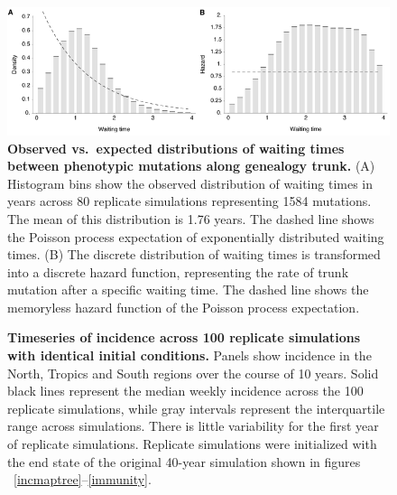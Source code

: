 \documentclass[11pt,oneside,letterpaper]{article}
\begin{document}
\begin{figure}[c]
	\centering
	\includegraphics{figures/waittimes}
	\caption{\textbf{Observed vs.\ expected distributions of waiting times between phenotypic mutations along genealogy trunk.} (A) Histogram bins show the observed distribution of waiting times in years across 80 replicate simulations representing 1584 mutations.  The mean of this distribution is 1.76 years.  The dashed line shows the Poisson process expectation of exponentially distributed waiting times.  (B) The discrete distribution of waiting times is transformed into a discrete hazard function, representing the rate of trunk mutation after a specific waiting time.  The dashed line shows the memoryless hazard function of the Poisson process expectation.}
	\label{waittimes}
\end{figure}

\pagebreak

\begin{figure}[c]
	\centering
	\caption{\textbf{Timeseries of incidence across 100 replicate simulations with identical initial conditions.} Panels show incidence in the North, Tropics and South regions over the course of 10 years.  Solid black lines represent the median weekly incidence across the 100 replicate simulations, while gray intervals represent the interquartile range across simulations.  There is little variability for the first year of replicate simulations.  Replicate simulations were initialized with the end state of the original 40-year simulation shown in figures ~\ref{incmaptree}--\ref{immunity}.}
	\label{replicatetimeseries}
\end{figure}
\end{document}
